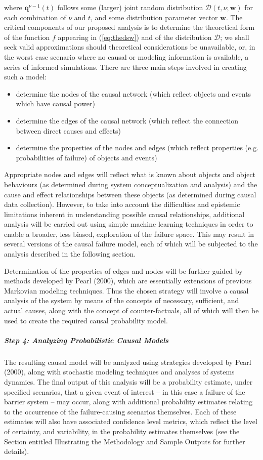 where $\mathbf{q}^{\nu-1}(t)$ follows some (larger) joint random distribution $\mathcal{D}(t,\nu;\mathbf{w})$ for each combination of $\nu$ and $t$, and some distribution parameter vector $\mathbf{w}$. The critical components of our proposed analysis is to determine the theoretical form of the function $f$ appearing in (\ref{eq:thedsw}) and of the distribution $\mathcal{D}$; we shall seek valid approximations should theoretical considerations be unavailable, or, in the worst case scenario where no causal or modeling information is available, a series of informed simulations.
\newl
There are three main steps involved in creating such a model:
\begin{itemize}[noitemsep]
	\item determine the nodes of the causal network (which reflect objects and events which have causal power)
	\item determine the edges of the causal network (which reflect the connection between direct causes and effects)
	\item determine the properties of the nodes and edges (which reflect properties (e.g. probabilities of failure) of objects and events)
\end{itemize}
Appropriate nodes and edges will reflect what is known about objects and object behaviours (as determined during system conceptualization and analysis) and the cause and effect relationships between these objects (as determined during causal data collection). However, to take into account the difficulties and epistemic limitations inherent in understanding possible causal relationships, additional analysis will be carried out using simple machine learning techniques in order to enable a broader, less biased, exploration of the failure space. This may result in several versions of the causal failure model, each of which will be subjected to the analysis described in the following section.

Determination of the properties of edges and nodes will be further guided by methods developed by Pearl (2000), which are essentially extensions of previous Markovian modeling techniques. Thus the chosen strategy will involve a causal analysis of the system by means of the concepts of necessary, sufficient, and actual causes, along with the concept of counter-factuals, all of which will then be used to create the required causal probability model.

\subparagraph{Step 4: Analyzing Probabilistic Causal Models}
\label{sec:methodstep4}
The resulting causal model will be analyzed using strategies developed by Pearl (2000), along with stochastic modeling techniques and analyses of systems dynamics. The final output of this analysis will be a probability estimate, under specified scenarios, that a given event of interest -- in this case a failure of the barrier system -- may occur, along with additional probability estimates relating to the occurrence of the failure-causing scenarios themselves. 
\newl Each of these estimates will also have associated confidence level metrics, which reflect the level of certainty, and variability, in the probability estimates themselves (see the Section entitled Illustrating the Methodology and Sample Outputs for further details).

